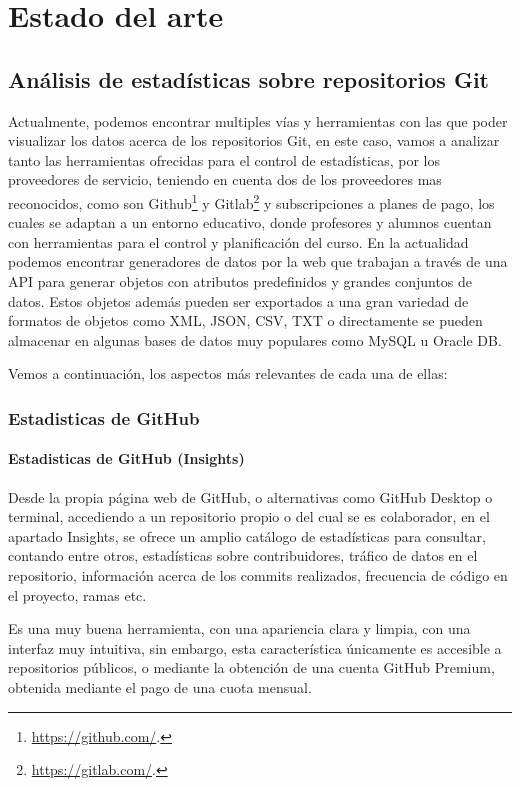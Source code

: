 \chapter{Estado del arte\label{02estadoArte}}

\section{Análisis de estadísticas sobre repositorios Git}

Actualmente, podemos encontrar multiples vías y herramientas con las que
poder visualizar los datos acerca de los repositorios Git, en este caso,
vamos a analizar tanto las herramientas ofrecidas para el control de
estadísticas, por los proveedores de servicio, teniendo en cuenta dos de
los proveedores mas reconocidos, como son
Github\footnote{\url{https://github.com/}.} y
Gitlab\footnote{\url{https://gitlab.com/}.} y subscripciones a planes de
pago, los cuales se adaptan a un entorno educativo, donde profesores y
alumnos cuentan con herramientas para el control y planificación del curso.
En la actualidad podemos encontrar generadores de datos por la web que
trabajan a través de una API para generar objetos con atributos
predefinidos y grandes conjuntos de datos. Estos objetos además pueden ser
exportados a una gran variedad de formatos de objetos como XML, JSON, CSV,
TXT o directamente se pueden almacenar en algunas bases de datos muy
populares como MySQL u Oracle DB.

Vemos a continuación, los aspectos más relevantes de cada una de ellas:


\subsection{Estadisticas de GitHub}

\subsubsection{Estadisticas de GitHub (Insights)}

Desde la propia página web de GitHub, o alternativas como GitHub Desktop o
terminal, accediendo a un repositorio propio o del cual se es colaborador,
en el apartado Insights, se ofrece un amplio catálogo de estadísticas para
consultar, contando entre otros, estadísticas sobre contribuidores, tráfico
de datos en el repositorio, información acerca de los commits realizados,
frecuencia de código en el proyecto, ramas etc.

Es una muy buena herramienta, con una apariencia clara y limpia, con una
interfaz muy intuitiva, sin embargo, esta característica únicamente es
accesible a repositorios públicos, o mediante la obtención de una cuenta
GitHub Premium, obtenida mediante el pago de una cuota mensual.

